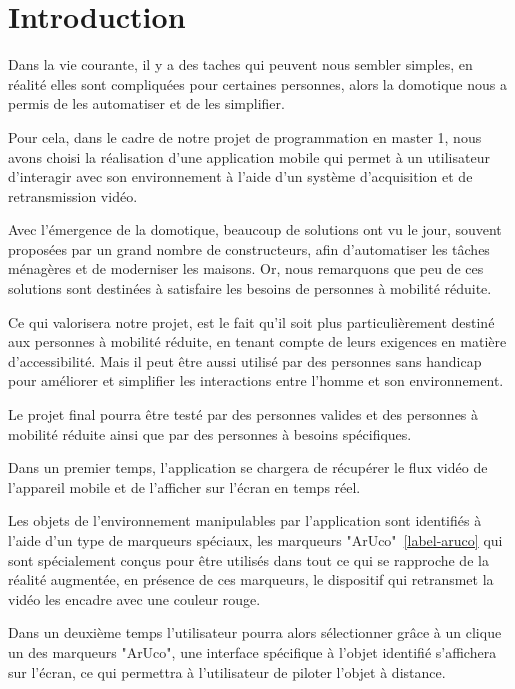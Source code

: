 \documentclass[12pt,a4paper]{article}
\begin{document}
\section{Introduction}

Dans la vie courante, il y a des taches qui peuvent nous sembler simples, en  réalité elles sont compliquées pour certaines personnes, alors la domotique nous a permis de les automatiser et de les simplifier.\par

Pour cela, dans le cadre de notre projet de programmation en master 1, nous avons choisi la réalisation d'une application mobile qui permet à un utilisateur d'interagir avec son environnement à l'aide d'un système d'acquisition et de retransmission vidéo.\par

Avec l'émergence de la domotique, beaucoup de solutions ont vu le jour, souvent proposées par un grand nombre de constructeurs, afin d'automatiser les tâches ménagères et de moderniser les maisons. Or, nous remarquons que peu de ces solutions sont destinées à satisfaire les besoins de personnes à mobilité réduite.\par

Ce qui valorisera notre projet, est le fait qu'il soit plus particulièrement destiné aux personnes à mobilité réduite, en tenant compte de leurs exigences en matière d'accessibilité. Mais il peut être aussi utilisé par des personnes sans handicap pour améliorer et simplifier les interactions entre l’homme et son environnement.\par

Le projet final pourra être testé par des personnes valides et des personnes à mobilité réduite ainsi que par des personnes à besoins spécifiques.\par

Dans un premier temps, l'application se chargera de récupérer le flux vidéo de l'appareil mobile et de l'afficher sur l'écran en temps réel.\par

Les objets de l'environnement manipulables par l'application sont identifiés à l'aide d'un type de marqueurs spéciaux, les marqueurs "ArUco"~\ref{label-aruco} qui sont spécialement conçus pour être utilisés dans tout ce qui se rapproche de la réalité augmentée, en présence de ces marqueurs, le dispositif qui retransmet la vidéo les encadre avec une couleur rouge.\par

Dans un deuxième temps l'utilisateur pourra alors sélectionner grâce à un clique un des marqueurs "ArUco", une interface spécifique à l'objet identifié s'affichera sur l'écran, ce  qui permettra à l'utilisateur de piloter l'objet à distance.\par
\end{document}
